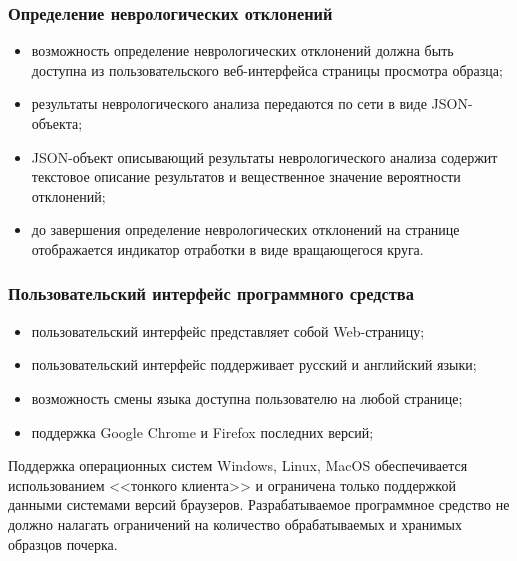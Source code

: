 \subsubsection{Определение неврологических отклонений}
\label{sec:freq:neuro_analysis}
\begin{itemize}
	\item возможность определение неврологических отклонений должна быть доступна из пользовательского веб-интерфейса страницы просмотра образца;
	\item результаты неврологического анализа передаются по сети в виде JSON-объекта;
	\item JSON-объект описывающий результаты неврологического анализа содержит текстовое описание результатов и вещественное значение вероятности отклонений;
	\item до завершения определение неврологических отклонений на странице отображается индикатор отработки в виде вращающегося круга.
\end{itemize}

\subsubsection{Пользовательский интерфейс программного средства}
\begin{itemize}
	\item пользовательский интерфейс представляет собой Web-страницу;
	\item пользовательский интерфейс поддерживает русский и английский \mbox{языки;}
	\item возможность смены языка доступна пользователю на любой \mbox{странице;}
	\item поддержка Google Chrome и Firefox последних версий;
\end{itemize}

Поддержка операционных систем Windows, Linux, MacOS обеспечивается использованием <<тонкого клиента>> и ограничена только поддержкой данными системами версий браузеров.
Разрабатываемое программное средство не должно налагать ограничений на количество обрабатываемых и хранимых образцов почерка.